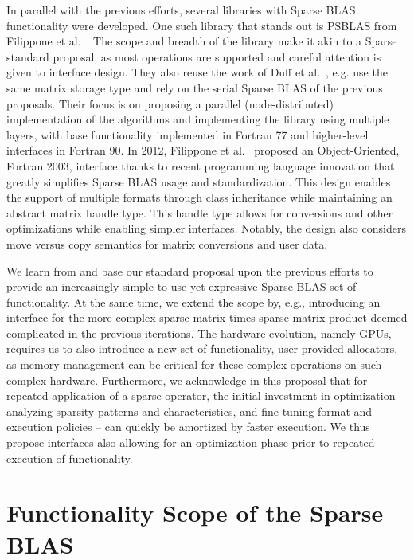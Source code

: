 \documentclass{article}
\begin{document}
In parallel with the previous efforts, several libraries with Sparse BLAS
functionality were developed. One such library that stands out is PSBLAS from
Filippone et al.~\cite{10.1145/365723.365732}. The scope and breadth of the
library make it akin to a Sparse standard proposal, as most operations are
supported and careful attention is given to interface design. They also
reuse the work of Duff et al.~\cite{10.1145/275323.275327}, e.g. use the same
matrix storage type and rely on the serial Sparse BLAS of the previous
proposals. Their focus is on proposing a parallel (node-distributed)
implementation of the algorithms and implementing the library using
multiple layers, with base functionality implemented in Fortran 77 and
higher-level interfaces in Fortran 90. In 2012, Filippone et
al.~\cite{10.1145/2331130.2331131} proposed an Object-Oriented, Fortran 2003,
interface thanks to recent programming language innovation that greatly
simplifies Sparse BLAS usage and standardization. This design enables the support
of multiple formats through class inheritance while maintaining an abstract
matrix handle type. This handle type allows for conversions and other optimizations while
enabling simpler interfaces. Notably, the design also considers move versus copy
semantics for matrix conversions and user data.

We learn from and base our standard proposal upon the previous efforts to provide an
increasingly simple-to-use yet expressive Sparse BLAS set of functionality. At
the same time, we extend the scope by, e.g., introducing an interface for
the more complex sparse-matrix times sparse-matrix product deemed
complicated in the previous iterations. The hardware evolution, namely GPUs,
requires us to also introduce a new set of functionality, user-provided allocators, as memory
management can be critical for these complex operations on such complex
hardware. 
Furthermore, we acknowledge in this proposal that for repeated application of a sparse operator, the initial investment in optimization -- analyzing sparsity patterns and characteristics, and fine-tuning format and execution policies -- can quickly be amortized by faster execution. We thus propose interfaces also allowing for an optimization phase prior to repeated execution of functionality.

\section{Functionality Scope of the Sparse BLAS}
\end{document}
